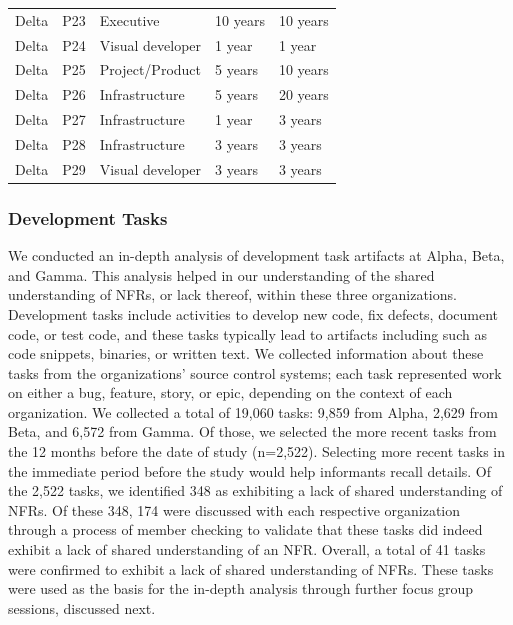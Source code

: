 \documentclass[smallextended]{svjour3}
\begin{document}
\begin{table}[!h]
\begin{tabular}{p{1.5cm}p{0.6cm}p{2.5cm}p{3.5cm}p{2cm}}
Delta & P23 & Executive & 10 years & 10 years\\
Delta & P24 & Visual developer & 1 year & 1 year\\
Delta & P25 & Project/Product & 5 years & 10 years\\
Delta & P26 & Infrastructure & 5 years & 20 years\\
Delta & P27 & Infrastructure & 1 year & 3 years\\
Delta & P28 & Infrastructure & 3 years & 3 years\\
Delta & P29 & Visual developer & 3 years & 3 years\\


\bottomrule
\end{tabular}
    
\end{table}




\subsubsection{Development Tasks}
\label{dev_tasks}
We conducted an in-depth analysis of development task artifacts at Alpha, Beta, and Gamma. This analysis helped in our understanding of the shared understanding of NFRs, or lack thereof, within these three organizations.
Development tasks include activities to develop new code, fix defects, document code, or test code, and these tasks typically lead to artifacts including such as code snippets, binaries, or written text. 
We collected information about these tasks from the organizations' source control systems; 
each task represented work on either a bug, feature, story, or epic, depending on the context of each organization.
We collected a total of 19,060 tasks: 9,859 from Alpha, 2,629 from Beta, and 6,572 from Gamma. Of those, we selected the more recent tasks from the 12 months before the date of study (n=2,522). Selecting more recent tasks in the immediate period before the study would help informants recall details. Of the 2,522 tasks, we identified 348 as exhibiting a lack of shared understanding of NFRs. 
Of these 348, 174 were discussed with each respective organization through a process of member checking to validate that these tasks did indeed exhibit a lack of shared understanding of an NFR. %
Overall, a total of 41 tasks were confirmed to exhibit a lack of shared understanding of NFRs.
These tasks were used as the basis for the in-depth analysis through further focus group sessions, discussed next. 
\end{document}
